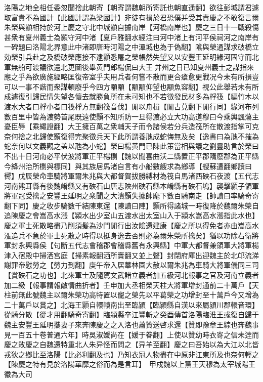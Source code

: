 洛陽之地全相任委忽聞捨此朝寄【朝寄謂魏朝所寄託也朝直遥翻】欲往彭城謂君遽取富貴不為國計【此國計謂為梁國計】非徒有損於君恐僕并受其責慶之不敢復言爾朱榮與顥相持於河上慶之守北中城顥自據南岸【河橋南岸也】慶之三日十一戰殺傷甚衆有夏州義士為顥守河中渚【夏戶雅翻水經注曰河中渚上有河平侯祠河之南岸有一碑題曰洛陽北界意此中渚即唐時河陽之中潬城也為于偽翻】隂與榮通謀求破橋立効榮引兵赴之及橋破榮應接不逮顥悉屠之榮帳然失望又以安豐王延明緣河固守而北軍無船可渡議欲還北更圖後舉黄門郎楊侃曰大王并州之日已知夏州義士之謀指來應之乎為欲廣施經略匡復帝室乎夫用兵者何嘗不散而更合瘡愈更戰况今未有所損豈可以一事不諧而衆謀頓廢乎今四方顒顒【顒顒仰望也顒魚容翻】視公此舉若未有所成遽復引歸民情失望各懷去就勝負所在未可知也不若徵發民材多為桴筏【編竹木以渡水大者曰桴小者曰筏桴方無翻筏音伐】閒以舟楫【閒古莧翻下閒行同】緣河布列數百里中皆為渡勢首尾既遠使顥不知所防一旦得渡必立大功高道穆曰今乘輿飄蕩主憂臣辱【乘繩證翻】大王擁百萬之衆輔天子而令諸侯若分兵造筏所在散渡指掌可克奈何捨之北歸使顥復得完聚徵兵天下此所謂養虺成蛇悔無及矣【逸書曰為虺不摧為蛇奈何以文義觀之盖以虺為小蛇】榮曰楊黄門已陳此策當相與議之劉靈助言於榮曰不出十日河南必平伏波將軍正平楊檦【魏以聞喜曲沃二縣置正平郡隋廢郡為正平縣今絳州治所檦與標同】與其族居馬渚自言有小船數艘求為鄉導【艘蘇遭翻鄉讀曰嚮】戊辰榮命車騎將軍爾朱兆與大都督賀拔勝縛材為筏自馬渚西硤石夜渡【五代志河南熊耳縣有後魏崤縣又有硤石山唐志陜州硤石縣本崤縣有硤石塢】襲擊顥子領軍將軍冠受擒之安豐王延明之衆聞之大潰顥失據帥麾下數百騎南走【帥讀曰率騎奇寄翻下同】慶之收步騎數千結陳東還【陳讀曰陣】顥所得諸城一時復降於魏爾朱榮自追陳慶之會嵩高水漲【潁水出少室山五渡水出太室山入于潁水嵩高水漲指此水也】慶之軍士死散略盡乃削須髪為沙門閒行出汝隂還建康【慶之所以得免者亦由嵩高水漲追兵不急於軍士死散之時得以挺身逸去否則必為爾朱榮所擒矣】猶以功除右衛將軍封永興縣侯【句斷五代志會稽郡會稽縣舊有永興縣】中軍大都督兼領軍大將軍楊津入宿殿中掃洒宫庭【掃素報翻洒所賣翻又並上聲】封閉府庫出迎魏主於北邙流涕謝罪帝慰勞之【勞力到翻】庚午帝入居蕐林園大赦以爾朱兆為車騎大將軍儀同三司【賞硤石之功也】北來軍士及隨駕文武諸立義者加五級河北報事之官及河南立義者加二級【報事謂報敵情曲折者】壬申加大丞相榮天柱大將軍增封通前二十萬戶【天柱前無此號魏主以爾朱榮功高特置以寵之榮先以平葛榮之功增封至十萬戶今又增為二十萬戶以賞之】北海王顥自轘轅南出至臨潁【臨潁縣自漢以來屬潁川郡轘音環】從騎分散【從才用翻騎奇寄翻】臨潁縣卒江豐斬之癸酉傳首洛陽臨淮王彧復自歸于魏主安豐王延明攜妻子來奔陳慶之之入洛也蕭贊送啓求還【贊即豫章王綜也奔魏事見一百五十卷普通六年】時吳淑媛尚在【媛于眷翻】上使以贊幼時衣寄之信未逹而慶之敗慶之自魏還特重北人朱异怪而問之【异羊至翻】慶之曰吾始以為大江以北皆戎狄之鄉比至洛陽【比必利翻及也】乃知衣冠人物盡在中原非江東所及也奈何輕之【陳慶之特有見於洛陽華靡之俗而為是言耳】　甲戍魏以上黨王天穆為太宰城陽王徽為大司